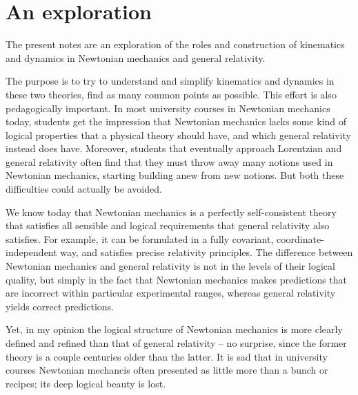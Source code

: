 \documentclass[\ifafour a4paper,12pt,\else a5paper,10pt,\fi%
onecolumn,oneside,article,%
british%
]{memoir}
\theoremstyle{remark}
\theoremstyle{innote}
\renewcommand*{\|}[1][]{\nonscript\,#1\vert\nonscript\;\mathopen{}}
\begin{document}

\setcounter{section}{-1}
\section{An exploration}
\label{sec:soup}

The present notes are an exploration of the roles and construction of
kinematics and dynamics in Newtonian mechanics and general relativity.

The purpose is to try to understand and simplify kinematics and dynamics in
these two theories, find as many common points as possible. This effort is
also pedagogically important. In most university courses in Newtonian
mechanics today, students get the impression that Newtonian mechanics lacks
some kind of logical properties that a physical theory should have, and
which general relativity instead does have. Moreover, students that
eventually approach Lorentzian and general relativity often find that they
must throw away many notions used in Newtonian mechanics, starting building
anew from new notions. But both these difficulties could actually be
avoided.

We know today that Newtonian mechanics is a perfectly self-consistent
theory that satisfies all sensible and logical requirements that general
relativity also satisfies. For example, it can be formulated in a fully
covariant, coordinate-independent way, and satisfies precise relativity
principles. The difference between Newtonian mechanics and general
relativity is not in the levels of their logical quality, but simply in the
fact that Newtonian mechanics makes predictions that are incorrect within
particular experimental ranges, whereas general relativity yields correct
predictions.

Yet, in my opinion the logical structure of Newtonian mechanics is more
clearly defined and refined than that of general relativity -- no surprise,
since the former theory is a couple centuries older than the latter. It is
sad that in university courses Newtonian mechancis often presented as
little more than a bunch or recipes; its deep logical beauty is
lost.
\end{document}
